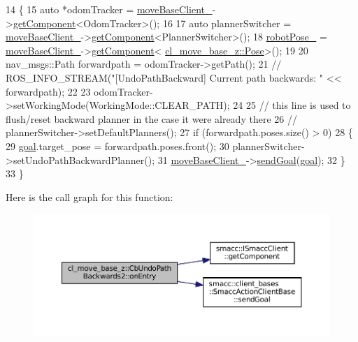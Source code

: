 \begin{DoxyCode}
14 \{
15   \textcolor{keyword}{auto} *odomTracker = \hyperlink{classcl__move__base__z_1_1CbMoveBaseClientBehaviorBase_ab2ef219464cfac8659b4a87c8d0db6d5}{moveBaseClient\_}->\hyperlink{classsmacc_1_1ISmaccClient_adef78db601749ca63c19e74a27cb88cc}{getComponent}<OdomTracker>();
16 
17   \textcolor{keyword}{auto} plannerSwitcher = \hyperlink{classcl__move__base__z_1_1CbMoveBaseClientBehaviorBase_ab2ef219464cfac8659b4a87c8d0db6d5}{moveBaseClient\_}->\hyperlink{classsmacc_1_1ISmaccClient_adef78db601749ca63c19e74a27cb88cc}{getComponent}<PlannerSwitcher>();
18   \hyperlink{classcl__move__base__z_1_1CbUndoPathBackwards2_a2d398dac07efaca840fbcea31957cf7a}{robotPose\_} = \hyperlink{classcl__move__base__z_1_1CbMoveBaseClientBehaviorBase_ab2ef219464cfac8659b4a87c8d0db6d5}{moveBaseClient\_}->\hyperlink{classsmacc_1_1ISmaccClient_adef78db601749ca63c19e74a27cb88cc}{getComponent}<
      \hyperlink{classcl__move__base__z_1_1Pose}{cl\_move\_base\_z::Pose}>();
19 
20   nav\_msgs::Path forwardpath = odomTracker->getPath();
21   \textcolor{comment}{// ROS\_INFO\_STREAM("[UndoPathBackward] Current path backwards: " << forwardpath);}
22 
23   odomTracker->setWorkingMode(WorkingMode::CLEAR\_PATH);
24 
25   \textcolor{comment}{// this line is used to flush/reset backward planner in the case it were already there}
26   \textcolor{comment}{// plannerSwitcher->setDefaultPlanners();}
27   \textcolor{keywordflow}{if} (forwardpath.poses.size() > 0)
28   \{
29     \hyperlink{classcl__move__base__z_1_1CbUndoPathBackwards2_a1b5d0fce772f7484b35abada92cf2b91}{goal}.target\_pose = forwardpath.poses.front();
30     plannerSwitcher->setUndoPathBackwardPlanner();
31     \hyperlink{classcl__move__base__z_1_1CbMoveBaseClientBehaviorBase_ab2ef219464cfac8659b4a87c8d0db6d5}{moveBaseClient\_}->\hyperlink{classsmacc_1_1client__bases_1_1SmaccActionClientBase_a9c47a5094ac8afb01680307fe5eca922}{sendGoal}(\hyperlink{classcl__move__base__z_1_1CbUndoPathBackwards2_a1b5d0fce772f7484b35abada92cf2b91}{goal});
32   \}
33 \}
\end{DoxyCode}
Here is the call graph for this function\+:
\nopagebreak
\begin{figure}[H]
\begin{center}
\leavevmode
\includegraphics[width=350pt]{classcl__move__base__z_1_1CbUndoPathBackwards2_a1b96187df9be6ce0fbdb5511147685d3_cgraph}
\end{center}
\end{figure}
